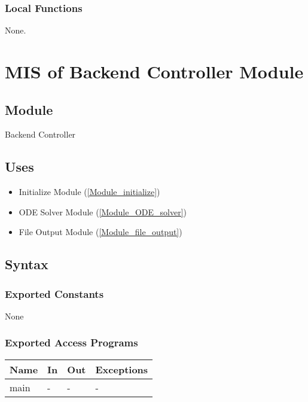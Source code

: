 \documentclass[12pt, titlepage]{article}
\begin{document}
\subsubsection{Local Functions}

None.

\newpage

\section{MIS of Backend Controller Module} \label{Module_backend_controller} 

\subsection{Module}

Backend Controller

\subsection{Uses}

\begin{itemize}
  \item Initialize Module (\ref{Module_initialize})
  \item ODE Solver Module (\ref{Module_ODE_solver})
  \item File Output Module (\ref{Module_file_output})
\end{itemize}

\subsection{Syntax}

\subsubsection{Exported Constants}
None

\subsubsection{Exported Access Programs}

\begin{center}
\begin{tabular}{p{2cm} p{4cm} p{4cm} p{2cm}}
\hline
\textbf{Name} & \textbf{In} & \textbf{Out} & \textbf{Exceptions} \\
\hline
main & - & - & - \\
\hline
\end{tabular}
\end{center}
\end{document}
